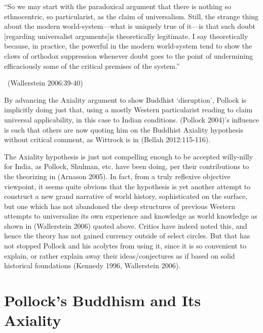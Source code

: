 \begin{myquote}
“So we may start with the paradoxical argument that there is nothing so ethnocentric, so particularist, as the claim of universalism. Still, the strange thing about the modern world-system—what is uniquely true of it—is that such doubt [regarding universalist arguments]is theoretically legitimate. I say theoretically because, in practice, the powerful in the modern world-system tend to show the claws of orthodox suppression whenever doubt goes to the point of undermining efficaciously some of the critical premises of the system.” 

~\hfill (Wallerstein 2006:39-40)
\end{myquote}

By advancing the Axiality argument to show Buddhist ‘disruption’, Pollock is implicitly doing just that, using a mostly Western particularist reading to claim universal applicability, in this case to Indian conditions. (Pollock 2004)’s influence is such that others are now quoting him on the Buddhist Axiality hypothesis without critical comment, as Wittrock is in (Bellah 2012:115-116).

The Axiality hypothesis is just not compelling enough to be accepted willy-nilly for India, as Pollock, Shulman, etc. have been doing, per their contributions to the theorizing in (Arnason 2005). In fact, from a truly reflexive objective viewpoint, it seems quite obvious that the hypothesis is yet another attempt to construct a new grand narrative of world history, sophisticated on the surface, but one which has not abandoned the deep structures of previous Western attempts to universalize its own experience and knowledge as world knowledge as shown in (Wallerstein 2006) quoted above. Critics have indeed noted this, and hence the theory has not gained currency outside of select circles. But that has not stopped Pollock and his acolytes from using it, since it is so convenient to explain, or rather explain away their ideas/conjectures as if based on solid historical foundations (Kennedy 1996, Wallerstein 2006).

\vspace{-.3cm}

\section*{Pollock’s Buddhism and Its Axiality}

